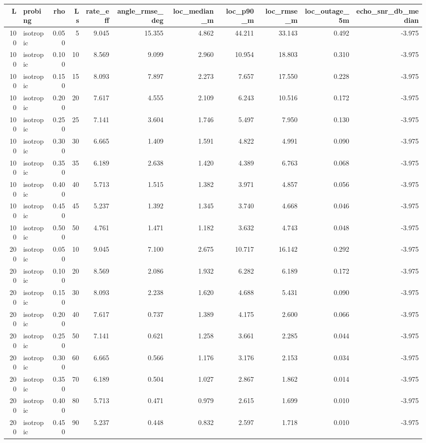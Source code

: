 \begin{tabular}{rlrrrrrrrrr}
\toprule
L & probing & rho & Ls & rate_eff & angle_rmse_deg & loc_median_m & loc_p90_m & loc_rmse_m & loc_outage_5m & echo_snr_db_median \\
\midrule
100 & isotropic & 0.050 & 5 & 9.045 & 15.355 & 4.862 & 44.211 & 33.143 & 0.492 & -3.975 \\
100 & isotropic & 0.100 & 10 & 8.569 & 9.099 & 2.960 & 10.954 & 18.803 & 0.310 & -3.975 \\
100 & isotropic & 0.150 & 15 & 8.093 & 7.897 & 2.273 & 7.657 & 17.550 & 0.228 & -3.975 \\
100 & isotropic & 0.200 & 20 & 7.617 & 4.555 & 2.109 & 6.243 & 10.516 & 0.172 & -3.975 \\
100 & isotropic & 0.250 & 25 & 7.141 & 3.604 & 1.746 & 5.497 & 7.950 & 0.130 & -3.975 \\
100 & isotropic & 0.300 & 30 & 6.665 & 1.409 & 1.591 & 4.822 & 4.991 & 0.090 & -3.975 \\
100 & isotropic & 0.350 & 35 & 6.189 & 2.638 & 1.420 & 4.389 & 6.763 & 0.068 & -3.975 \\
100 & isotropic & 0.400 & 40 & 5.713 & 1.515 & 1.382 & 3.971 & 4.857 & 0.056 & -3.975 \\
100 & isotropic & 0.450 & 45 & 5.237 & 1.392 & 1.345 & 3.740 & 4.668 & 0.046 & -3.975 \\
100 & isotropic & 0.500 & 50 & 4.761 & 1.471 & 1.182 & 3.632 & 4.743 & 0.048 & -3.975 \\
200 & isotropic & 0.050 & 10 & 9.045 & 7.100 & 2.675 & 10.717 & 16.142 & 0.292 & -3.975 \\
200 & isotropic & 0.100 & 20 & 8.569 & 2.086 & 1.932 & 6.282 & 6.189 & 0.172 & -3.975 \\
200 & isotropic & 0.150 & 30 & 8.093 & 2.238 & 1.620 & 4.688 & 5.431 & 0.090 & -3.975 \\
200 & isotropic & 0.200 & 40 & 7.617 & 0.737 & 1.389 & 4.175 & 2.600 & 0.066 & -3.975 \\
200 & isotropic & 0.250 & 50 & 7.141 & 0.621 & 1.258 & 3.661 & 2.285 & 0.044 & -3.975 \\
200 & isotropic & 0.300 & 60 & 6.665 & 0.566 & 1.176 & 3.176 & 2.153 & 0.034 & -3.975 \\
200 & isotropic & 0.350 & 70 & 6.189 & 0.504 & 1.027 & 2.867 & 1.862 & 0.014 & -3.975 \\
200 & isotropic & 0.400 & 80 & 5.713 & 0.471 & 0.979 & 2.615 & 1.699 & 0.010 & -3.975 \\
200 & isotropic & 0.450 & 90 & 5.237 & 0.448 & 0.832 & 2.597 & 1.718 & 0.010 & -3.975 \\

\end{tabular}
